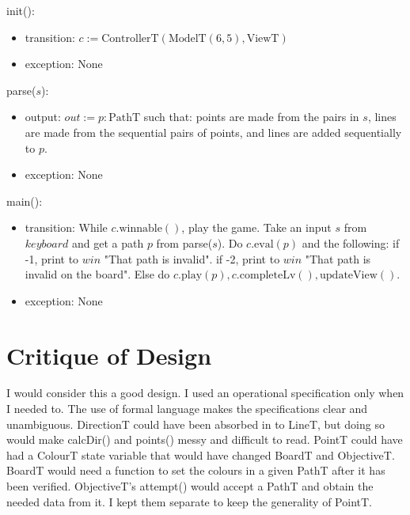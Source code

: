 \documentclass[12pt]{article}
\begin{document}
init():
\begin{itemize}
	\item transition: $c := \mbox{ControllerT}(\mbox{ModelT}(6, 5), \mbox{ViewT})$
	\item exception: None
\end{itemize}

\noindent parse($s$):
\begin{itemize}
	\item output: $out := p : \mbox{PathT}$ such that: points are made from the pairs in $s$, lines are made from the sequential pairs of points, and lines are added sequentially to $p$.
	\item exception: None
\end{itemize}

\noindent main():
\begin{itemize}
	\item transition: While $c.\mbox{winnable}()$, play the game. Take an input $s$ from $keyboard$ and get a path $p$ from parse($s$). Do $c.\mbox{eval}(p)$ and the following: if -1, print to $win$ "That path is invalid". if -2, print to $win$ "That path is invalid on the board". Else do $c.\mbox{play}(p), c.\mbox{completeLv}(),  \mbox{updateView}()$.
	\item exception: None
\end{itemize}

\newpage

\section* {Critique of Design}

I would consider this a good design. I used an operational specification only when I needed to. The use of formal language makes the specifications clear and unambiguous. DirectionT could have been absorbed in to LineT, but doing so would make calcDir() and points() messy and difficult to read. PointT could have had a ColourT state variable that would have changed BoardT and ObjectiveT. BoardT would need a function to set the colours in a given PathT after it has been verified. ObjectiveT's attempt() would accept a PathT and obtain the needed data from it. I kept them separate to keep the generality of PointT.
\end{document}
